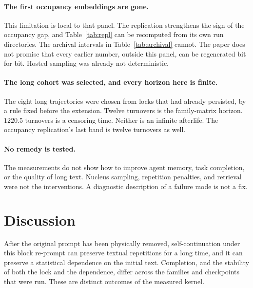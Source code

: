 \documentclass[10pt]{article}
\begin{document}
\paragraph{The first occupancy embeddings are gone.}
This limitation is local to that panel. %
The replication strengthens the sign of the occupancy gap, and
Table~\ref{tab:repl} can be recomputed from its own run directories.
The archival intervals in Table~\ref{tab:archival} cannot.
The paper does not promise that every earlier number, outside this
panel, can be regenerated bit for bit.
Hosted sampling was already not deterministic.

\paragraph{The long cohort was selected, and every horizon here is finite.}
The eight long trajectories were chosen from locks that had already
persisted, by a rule fixed before the extension.
Twelve turnovers is the family-matrix horizon. %
$1220.5$ turnovers is a censoring time. %
Neither is an infinite afterlife.
The occupancy replication's last band is twelve turnovers as well.

\paragraph{No remedy is tested.}
The measurements do not show how to improve agent memory, task
completion, or the quality of long text.
Nucleus sampling, repetition penalties, and retrieval were not the
interventions.
A diagnostic description of a failure mode is not a fix.

\section{Discussion}
\label{sec:discussion}

After the original prompt has been physically removed, self-continuation
under this block re-prompt can preserve textual repetitions for a long
time, and it can preserve a statistical dependence on the initial text.
Completion, and the stability of both the lock and the dependence,
differ across the families and checkpoints that were run.
These are distinct outcomes of the measured kernel.
\end{document}
